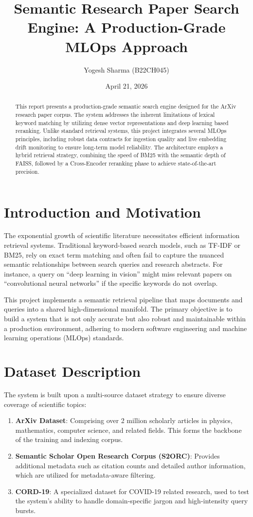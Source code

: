 \documentclass[11pt,a4paper]{article}
\title{\textbf{Semantic Research Paper Search Engine: A Production-Grade MLOps Approach}}
\author{Yogesh Sharma (B22CH045)}
\date{April 21, 2026}
\begin{document}
\maketitle

\begin{abstract}
This report presents a production-grade semantic search engine designed for the ArXiv research paper corpus. The system addresses the inherent limitations of lexical keyword matching by utilizing dense vector representations and deep learning based reranking. Unlike standard retrieval systems, this project integrates several MLOps principles, including robust data contracts for ingestion quality and live embedding drift monitoring to ensure long-term model reliability. The architecture employs a hybrid retrieval strategy, combining the speed of BM25 with the semantic depth of FAISS, followed by a Cross-Encoder reranking phase to achieve state-of-the-art precision.
\end{abstract}

\section{Introduction and Motivation}
The exponential growth of scientific literature necessitates efficient information retrieval systems. Traditional keyword-based search models, such as TF-IDF or BM25, rely on exact term matching and often fail to capture the nuanced semantic relationships between search queries and research abstracts. For instance, a query on ``deep learning in vision'' might miss relevant papers on ``convolutional neural networks'' if the specific keywords do not overlap.

This project implements a semantic retrieval pipeline that maps documents and queries into a shared high-dimensional manifold. The primary objective is to build a system that is not only accurate but also robust and maintainable within a production environment, adhering to modern software engineering and machine learning operations (MLOps) standards.

\section{Dataset Description}
The system is built upon a multi-source dataset strategy to ensure diverse coverage of scientific topics:
\begin{enumerate}
    \item \textbf{ArXiv Dataset}: Comprising over 2 million scholarly articles in physics, mathematics, computer science, and related fields. This forms the backbone of the training and indexing corpus.
    \item \textbf{Semantic Scholar Open Research Corpus (S2ORC)}: Provides additional metadata such as citation counts and detailed author information, which are utilized for metadata-aware filtering.
    \item \textbf{CORD-19}: A specialized dataset for COVID-19 related research, used to test the system's ability to handle domain-specific jargon and high-intensity query bursts.
\end{enumerate}
\end{document}
